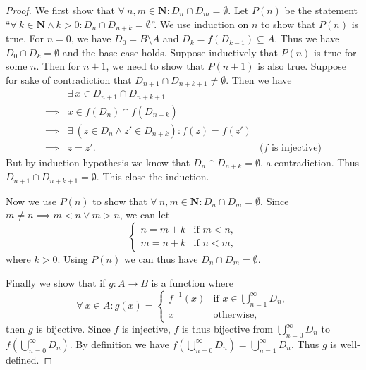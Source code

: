 \begin{proof}
    We first show that \(\forall\ n, m \in \mathbf{N} : D_n \cap D_m = \emptyset\).
    Let \(P(n)\) be the statement ``\(\forall\ k \in \mathbf{N} \land k > 0 : D_n \cap D_{n + k} = \emptyset\)''.
    We use induction on \(n\) to show that \(P(n)\) is true.
    For \(n = 0\), we have \(D_0 = B \setminus A\) and \(D_k = f(D_{k - 1}) \subseteq A\).
    Thus we have \(D_0 \cap D_k = \emptyset\) and the base case holds.
    Suppose inductively that \(P(n)\) is true for some \(n\).
    Then for \(n + 1\), we need to show that \(P(n + 1)\) is also true.
    Suppose for sake of contradiction that \(D_{n + 1} \cap D_{n + k + 1} \neq \emptyset\).
    Then we have
    \begin{align*}
                 & \exists\ x \in D_{n + 1} \cap D_{n + k + 1}                                              \\
        \implies & x \in f(D_n) \cap f(D_{n + k})                                                           \\
        \implies & \exists\ (z \in D_n \land z' \in D_{n + k}) : f(z) = f(z')                               \\
        \implies & z = z'.                                                    & \text{(\(f\) is injective)}
    \end{align*}
    But by induction hypothesis we know that \(D_n \cap D_{n + k} = \emptyset\), a contradiction.
    Thus \(D_{n + 1} \cap D_{n + k + 1} = \emptyset\).
    This close the induction.

    Now we use \(P(n)\) to show that \(\forall\ n, m \in \mathbf{N} : D_n \cap D_m = \emptyset\).
    Since \(m \neq n \implies m < n \lor m > n\), we can let
    \[
        \begin{cases}
            n = m + k & \text{if } m < n, \\
            m = n + k & \text{if } n < m,
        \end{cases}
    \]
    where \(k > 0\).
    Using \(P(n)\) we can thus have \(D_n \cap D_m = \emptyset\).

    Finally we show that if \(g : A \to B\) is a function where
    \[
        \forall\ x \in A : g(x) = \begin{cases}
            f^{-1}(x) & \text{if } x \in \bigcup_{n = 1}^\infty D_n, \\
            x         & \text{otherwise},
        \end{cases}
    \]
    then \(g\) is bijective.
    Since \(f\) is injective, \(f\) is thus bijective from \(\bigcup_{n = 0}^\infty D_n\) to \(f(\bigcup_{n = 0}^\infty D_n)\).
    By definition we have \(f(\bigcup_{n = 0}^\infty D_n) = \bigcup_{n = 1}^\infty D_n\).
    Thus \(g\) is well-defined.


\end{proof}
